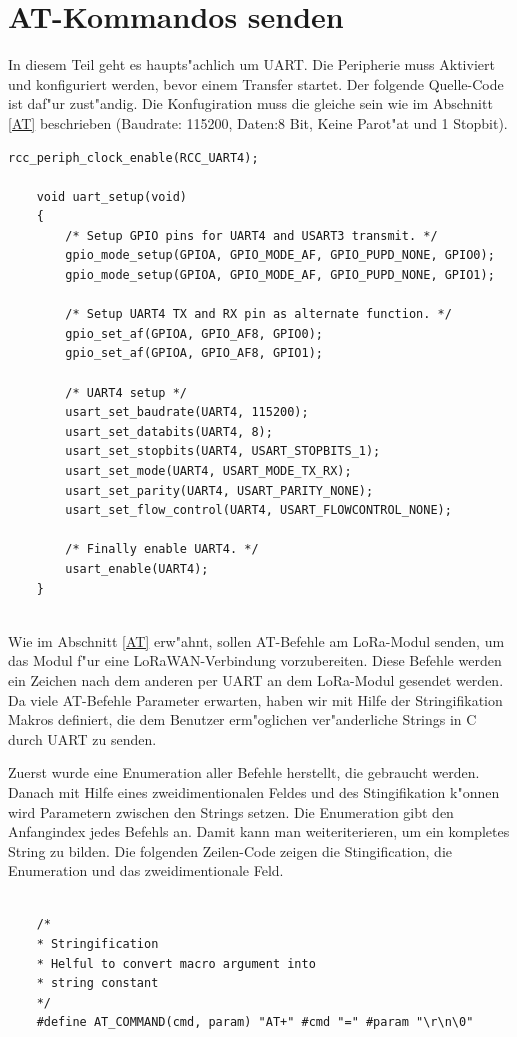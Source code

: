 \section{AT-Kommandos senden}
In diesem Teil geht es haupts"achlich um UART. Die Peripherie muss Aktiviert und konfiguriert werden, bevor einem Transfer startet. Der folgende Quelle-Code ist daf"ur zust"andig.
Die Konfugiration muss die gleiche sein wie im Abschnitt \ref{AT} beschrieben (Baudrate: 115200, Daten:8 Bit, Keine Parot"at und 1 Stopbit).
\begin{lstlisting}[frame=single]
	rcc_periph_clock_enable(RCC_UART4);
	
	void uart_setup(void)
	{
		/* Setup GPIO pins for UART4 and USART3 transmit. */
		gpio_mode_setup(GPIOA, GPIO_MODE_AF, GPIO_PUPD_NONE, GPIO0);
		gpio_mode_setup(GPIOA, GPIO_MODE_AF, GPIO_PUPD_NONE, GPIO1);
	
		/* Setup UART4 TX and RX pin as alternate function. */
		gpio_set_af(GPIOA, GPIO_AF8, GPIO0);
		gpio_set_af(GPIOA, GPIO_AF8, GPIO1);
	
		/* UART4 setup */
		usart_set_baudrate(UART4, 115200);
		usart_set_databits(UART4, 8);
		usart_set_stopbits(UART4, USART_STOPBITS_1);
		usart_set_mode(UART4, USART_MODE_TX_RX);
		usart_set_parity(UART4, USART_PARITY_NONE);
		usart_set_flow_control(UART4, USART_FLOWCONTROL_NONE);
	
		/* Finally enable UART4. */
		usart_enable(UART4);
	}
	
\end{lstlisting}  

Wie im Abschnitt \ref{AT} erw"ahnt, sollen AT-Befehle am LoRa-Modul  senden, um das Modul f"ur eine LoRaWAN-Verbindung vorzubereiten. Diese Befehle werden  ein Zeichen nach dem anderen per UART an dem LoRa-Modul gesendet werden. Da viele AT-Befehle Parameter erwarten, haben wir mit Hilfe der Stringifikation Makros definiert, die dem Benutzer erm"oglichen ver"anderliche Strings in C durch UART zu senden. 

Zuerst wurde eine Enumeration aller Befehle herstellt, die gebraucht werden. Danach mit Hilfe eines zweidimentionalen Feldes und des Stingifikation k"onnen wird Parametern zwischen den Strings setzen. Die Enumeration gibt den Anfangindex jedes Befehls an. Damit kann man weiteriterieren, um ein kompletes String zu bilden. Die folgenden Zeilen-Code zeigen die Stingification, die Enumeration und das zweidimentionale Feld.

\vspace{2cm}
\begin{lstlisting}[frame=single]

	/*
	* Stringification
	* Helful to convert macro argument into
	* string constant
	*/
	#define AT_COMMAND(cmd,	param) "AT+" #cmd "=" #param "\r\n\0"
	
\end{lstlisting}     

